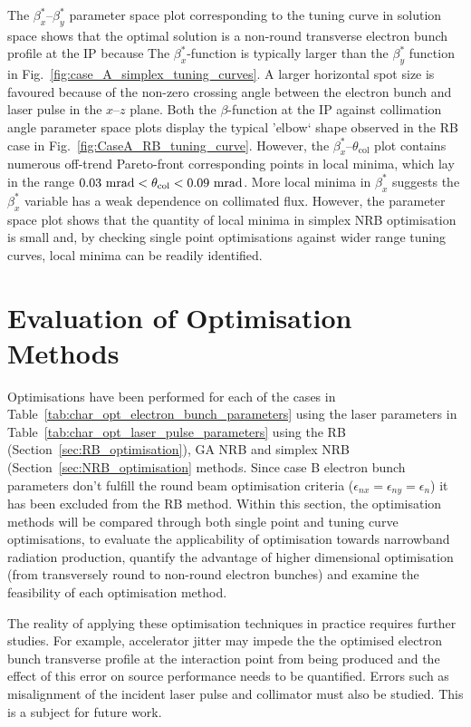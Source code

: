 \documentclass[../main.tex]{subfiles}
\begin{document}
The $\beta_{x}^{*}$--$\beta_{y}^{*}$ parameter space plot corresponding to the tuning curve in solution space shows that the optimal solution is a non-round transverse electron bunch profile at the IP because The $\beta_{x}^{*}$-function is typically larger than the $\beta_{y}^{*}$ function in Fig.~\ref{fig:case_A_simplex_tuning_curves}. A larger horizontal spot size is favoured because of the non-zero crossing angle between the electron bunch and laser pulse in the $x$--$z$ plane. Both the $\beta$-function at the IP against collimation angle parameter space plots display the typical 'elbow` shape observed in the RB case in Fig.~\ref{fig:CaseA_RB_tuning_curve}. However, the $\beta_{x}^{*}$--$\theta_{\mathrm{col}}$ plot contains numerous off-trend Pareto-front corresponding points in local minima, which lay in the range $0.03~\textrm{\si{\milli\radian}} < \theta_{\mathrm{col}} < 0.09~\mathrm{\si{\milli\radian}}$. More local minima in $\beta_{x}^{*}$ suggests the $\beta_{x}^{*}$ variable has a weak dependence on collimated flux. However, the parameter space plot shows that the quantity of local minima in simplex NRB optimisation is small and, by checking single point optimisations against wider range tuning curves, local minima can be readily identified.

\section{Evaluation of Optimisation Methods} 
\label{sec:evaluation_of_optimisation_methods}

Optimisations have been performed for each of the cases in Table~\ref{tab:char_opt_electron_bunch_parameters} using the laser parameters in Table~\ref{tab:char_opt_laser_pulse_parameters} using the RB (Section~\ref{sec:RB_optimisation}), GA NRB and simplex NRB (Section~\ref{sec:NRB_optimisation} methods. Since case B electron bunch parameters don't fulfill the round beam optimisation criteria ($\epsilon_{nx} = \epsilon_{ny} = \epsilon_{n}$) it has been excluded from the RB method. Within this section, the optimisation methods will be compared through both single point and tuning curve optimisations, to evaluate the applicability of optimisation towards narrowband radiation production, quantify the advantage of higher dimensional optimisation (from transversely round to non-round electron bunches) and examine the feasibility of each optimisation method. 

The reality of applying these optimisation techniques in practice requires further studies. For example, accelerator jitter may impede the the optimised electron bunch transverse profile at the interaction point from being produced and the effect of this error on source performance needs to be quantified. Errors such as misalignment of the incident laser pulse and collimator must also be studied. This is a subject for future work.  
\end{document}
